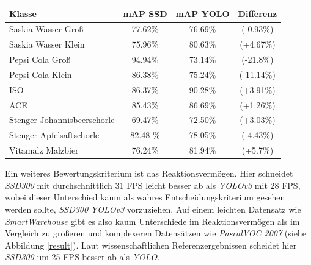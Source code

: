\begin{center}
	\begin{tabular}[H]{l|c|c|c}
		Klasse & mAP SSD & mAP YOLO & Differenz \\
		\hline
		Saskia Wasser Groß & 77.62\%  & 76.69\% & (-0.93\%) \\
		Saskia Wasser Klein & 75.96\%  & 80.63\% & (+4.67\%) \\
		Pepsi Cola Groß & 94.94\% & 73.14\% & (-21.8\%) \\
		Pepsi Cola Klein & 86.38\% & 75.24\% & (-11.14\%) \\
		ISO & 86.37\% & 90.28\% & (+3.91\%) \\
		ACE & 85.43\% & 86.69\% & (+1.26\%) \\
		Stenger Johannisbeerschorle & 69.47\% & 72.50\% & (+3.03\%) \\
		Stenger Apfelsaftschorle & 82.48 \% & 78.05\% & (-4.43\%) \\
		Vitamalz Malzbier & 76.24\% & 81.94\% & (+5.7\%)
	\end{tabular}
	\label{table:rescomparison}
\end{center}

Ein weiteres Bewertungskriterium ist das Reaktionsvermögen. Hier schneidet \textit{SSD300} mit durchschnittlich 31 FPS leicht besser ab als \textit{YOLOv3} mit 28 FPS, wobei dieser Unterschied kaum als wahres Entscheidungskriterium gesehen werden sollte, \textit{SSD300} \textit{YOLOv3} vorzuziehen. Auf einem leichten Datensatz wie \textit{SmartWarehouse} gibt es also kaum Unterschiede im Reaktionsvermögen als im Vergleich zu größeren und komplexeren Datensätzen wie \textit{PascalVOC 2007} (siehe Abbildung \ref{result}). Laut wissenschaftlichen Referenzergebnissen scheidet hier \textit{SSD300} um 25 FPS besser ab als \textit{YOLO}.

